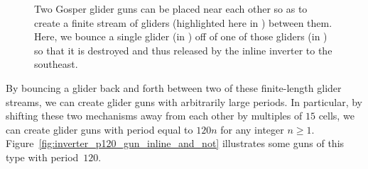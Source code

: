 \begin{figure}[!htb]
	\centering
	\caption{Two Gosper glider guns can be placed near each other so as to create a finite stream of gliders (highlighted here in ) between them. Here, we bounce a single glider (in ) off of one of those gliders (in ) so that it is destroyed and thus released by the inline inverter to the southeast.}
	\label{fig:inline_inverter_bounce}
\end{figure}

By bouncing a glider back and forth between two of these finite-length glider streams, we can create glider guns with arbitrarily large periods. In particular, by shifting these two mechanisms away from each other by multiples of $15$ cells, we can create glider guns with period equal to $120n$ for any integer $n \geq 1$. Figure~\ref{fig:inverter_p120_gun_inline_and_not} illustrates some guns of this type with period~$120$.


